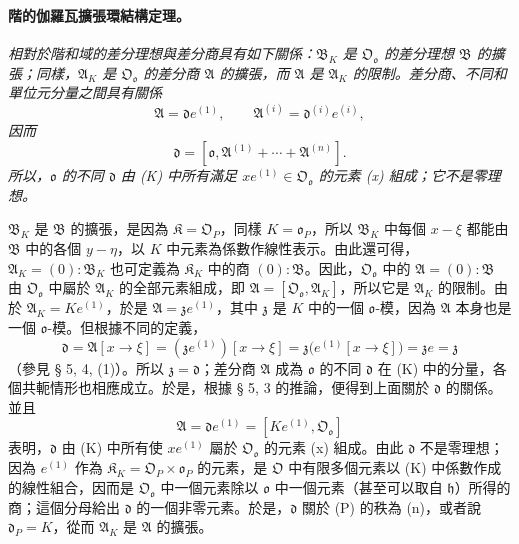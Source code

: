 \documentclass[11pt]{article}
\begin{document}
\paragraph{階的伽羅瓦擴張環結構定理。}
\emph{相對於階和域的差分理想與差分商具有如下關係：\(\mathfrak B_K\) 是 \(\mathfrak O_{\mathfrak o}\) 的差分理想 \(\mathfrak B\) 的擴張；同樣，\(\mathfrak A_K\) 是 \(\mathfrak O_{\mathfrak o}\) 的差分商 \(\mathfrak A\) 的擴張，而 \(\mathfrak A\) 是 \(\mathfrak A_K\) 的限制。差分商、不同和單位元分量之間具有關係}
\[
\mathfrak A=\mathfrak d e^{(1)},
\qquad
\mathfrak A^{(i)}=\mathfrak d^{(i)}e^{(i)},
\]
\emph{因而}
\[
\mathfrak d=[\mathfrak o,\mathfrak A^{(1)}+\cdots+\mathfrak A^{(n)}].
\]
\emph{所以，\(\mathfrak o\) 的不同 \(\mathfrak d\) 由 (K) 中所有滿足 \(xe^{(1)}\in\mathfrak O_{\mathfrak o}\) 的元素 (x) 組成；它不是零理想。}

\(\mathfrak B_K\) 是 \(\mathfrak B\) 的擴張，是因為 \(\mathfrak K=\mathfrak O_P\)，同樣 \(K=\mathfrak o_P\)，所以 \(\mathfrak B_K\) 中每個 \(x-\xi\) 都能由 \(\mathfrak B\) 中的各個 \(y-\eta\)，以 \(K\) 中元素為係數作線性表示。由此還可得，\(\mathfrak A_K=(0):\mathfrak B_K\) 也可定義為 \(\mathfrak K_K\) 中的商 \((0):\mathfrak B\)。因此，\(\mathfrak O_{\mathfrak o}\) 中的 \(\mathfrak A=(0):\mathfrak B\) 由 \(\mathfrak O_{\mathfrak o}\) 中屬於 \(\mathfrak A_K\) 的全部元素組成，即 \(\mathfrak A=[\mathfrak O_{\mathfrak o},\mathfrak A_K]\)，所以它是 \(\mathfrak A_K\) 的限制。由於 \(\mathfrak A_K=Ke^{(1)}\)，於是 \(\mathfrak A=\mathfrak z e^{(1)}\)，其中 \(\mathfrak z\) 是 \(K\) 中的一個 \(\mathfrak o\)-模，因為 \(\mathfrak A\) 本身也是一個 \(\mathfrak o\)-模。但根據不同的定義，
\[
\mathfrak d=\mathfrak A[x\to\xi]
=(\mathfrak z e^{(1)})[x\to\xi]
=\mathfrak z\bigl(e^{(1)}[x\to\xi]\bigr)=\mathfrak z e=\mathfrak z
\]
（參見 § 5, 4, (1)）。所以 \(\mathfrak z=\mathfrak d\)；差分商 \(\mathfrak A\) 成為 \(\mathfrak o\) 的不同 \(\mathfrak d\) 在 (K) 中的分量，各個共軛情形也相應成立。於是，根據 § 5, 3 的推論，便得到上面關於 \(\mathfrak d\) 的關係。並且
\[
\mathfrak A=\mathfrak d e^{(1)}=[Ke^{(1)},\mathfrak O_{\mathfrak o}]
\]
表明，\(\mathfrak d\) 由 (K) 中所有使 \(xe^{(1)}\) 屬於 \(\mathfrak O_{\mathfrak o}\) 的元素 (x) 組成。由此 \(\mathfrak d\) 不是零理想；因為 \(e^{(1)}\) 作為 \(\mathfrak K_K=\mathfrak O_P\times\mathfrak o_P\) 的元素，是 \(\mathfrak O\) 中有限多個元素以 (K) 中係數作成的線性組合，因而是 \(\mathfrak O_{\mathfrak o}\) 中一個元素除以 \(\mathfrak o\) 中一個元素（甚至可以取自 \(\mathfrak h\)）所得的商；這個分母給出 \(\mathfrak d\) 的一個非零元素。於是，\(\mathfrak d\) 關於 (P) 的秩為 (n)，或者說 \(\mathfrak d_P=K\)，從而 \(\mathfrak A_K\) 是 \(\mathfrak A\) 的擴張。
\end{document}
